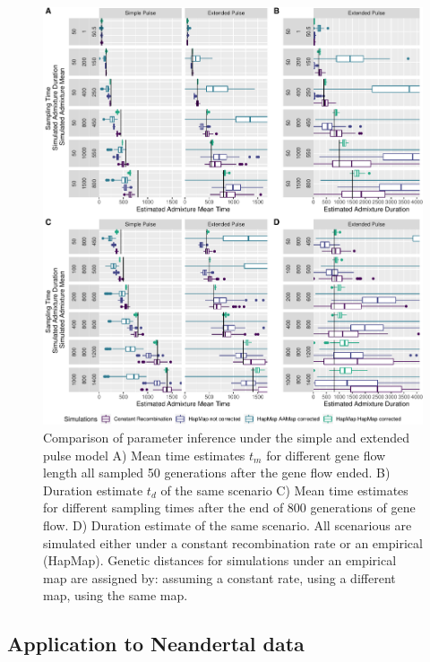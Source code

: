 \documentclass[]{article}
\begin{document}
\begin{figure}
\centering
\includegraphics{Admixture_Time_Inference_Paper_Draft_files/figure-latex/fig4-1.pdf}
\caption{\label{fig:fig4} Comparison of parameter inference under the simple and extended pulse model  A) Mean time estimates $t_m$ for different gene
flow length all sampled 50 generations after the gene flow ended. B)
Duration estimate $t_d$ of the same scenario C) Mean time estimates for different sampling times after the end of 800
generations of gene flow. D) Duration estimate of the same scenario. All scenarious are simulated either under a constant recombination rate or an empirical (HapMap). Genetic distances for simulations under an empirical map are assigned by: assuming a constant rate, using a different map, using the same map.  }
\end{figure}

\subsection{Application to Neandertal data}
\end{document}

